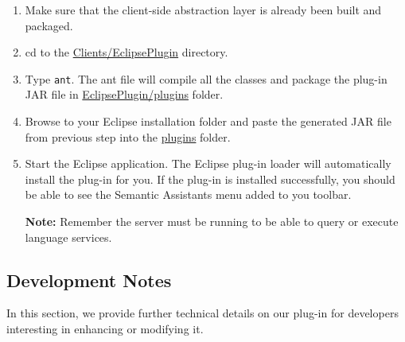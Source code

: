 \begin{enumerate}

  \item Make sure that the client-side abstraction layer is already been built
and packaged.

  \item cd to the \url{Clients/EclipsePlugin} directory.

  \item Type \texttt{ant}. The ant file will compile all the classes and package
the plug-in JAR file in \url{EclipsePlugin/plugins} folder.

  \item Browse to your Eclipse installation folder and paste the generated JAR
file from previous step into the \url{plugins} folder.
  
  \item Start the Eclipse application. The Eclipse plug-in loader will
automatically install the plug-in for you. If the plug-in is installed
successfully, you should be able to see the Semantic Assistants menu added to
you toolbar.

  \textbf{Note:} Remember the server must be running to be able to query or
execute language services.

\end{enumerate}

\subsection{Development Notes}
\label{subsec:eclipse.development}
In this section, we provide further technical details on our plug-in for
developers interesting in enhancing or modifying it.


